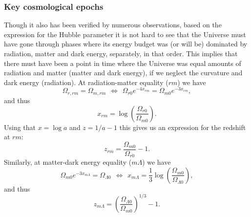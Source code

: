 \documentclass{aa}
\begin{document}
\subsubsection{Key cosmological epochs}
Though it also has been verified by numerous observations, based on the expression for the Hubble parameter it is not hard to see that the Universe must have gone through phases where its energy budget was (or will be) dominated by radiation, matter and dark energy, separately, in that order. This implies that there must have been a point in time where the Universe was equal amounts of radiation and matter (matter and dark energy), if we neglect the curvature and dark energy (radiation). At radiation-matter equality ($rm$) we have
\begin{equation}
    \Omega_{r,rm} = \Omega_{m,rm} 
    \hspace{5pt}\Leftrightarrow\hspace{5pt} 
    \Omega_{r0}e^{-4x_{rm}} = \Omega_{m0}e^{-3x_{rm}}, 
\end{equation}
and thus
\begin{equation}
  x_{rm} = \log\left(\frac{\Omega_{r0}}{\Omega_{m0}}\right).
\end{equation}
Using that $x = \log a$ and $z = 1/a - 1$ this gives us an expression for the redshift at $rm$:
\begin{equation}
  z_{rm} = \frac{\Omega_{m0}}{\Omega_{r0}} - 1.
\end{equation} 
Similarly, at matter-dark energy equality ($m\Lambda$) we have
\begin{equation}
  \Omega_{m0}e^{-3x_{m\Lambda}} = \Omega_{\Lambda0}
  \hspace{5pt}\Leftrightarrow\hspace{5pt}
  x_{m\Lambda} = \frac{1}{3}\log\left(\frac{\Omega_{m0}}{\Omega_{\Lambda0}}\right),
\end{equation}
and thus
\begin{equation}
  z_{m\Lambda} = \left(\frac{\Omega_{\Lambda0}}{\Omega_{m0}}\right)^{1/3} - 1.
\end{equation}
\end{document}
